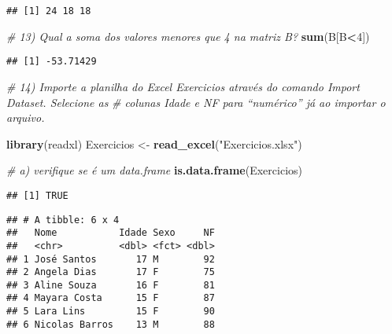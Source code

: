\documentclass[]{article}
\newenvironment{Shaded}{\begin{snugshade}}{\end{snugshade}}
\newcommand{\CommentTok}[1]{\textcolor[rgb]{0.56,0.35,0.01}{\textit{#1}}}
\newcommand{\DecValTok}[1]{\textcolor[rgb]{0.00,0.00,0.81}{#1}}
\newcommand{\KeywordTok}[1]{\textcolor[rgb]{0.13,0.29,0.53}{\textbf{#1}}}
\newcommand{\NormalTok}[1]{#1}
\newcommand{\OperatorTok}[1]{\textcolor[rgb]{0.81,0.36,0.00}{\textbf{#1}}}
\newcommand{\StringTok}[1]{\textcolor[rgb]{0.31,0.60,0.02}{#1}}
\begin{document}
\begin{verbatim}
## [1] 24 18 18
\end{verbatim}

\begin{Shaded}
\begin{Highlighting}[]
\CommentTok{# 13) Qual a soma dos valores menores que 4 na matriz B?}
\KeywordTok{sum}\NormalTok{(B[B}\OperatorTok{<}\DecValTok{4}\NormalTok{])}
\end{Highlighting}
\end{Shaded}

\begin{verbatim}
## [1] -53.71429
\end{verbatim}

\begin{Shaded}
\begin{Highlighting}[]
\CommentTok{# 14) Importe a planilha do Excel Exercicios através do comando Import Dataset. Selecione as}
\CommentTok{# colunas Idade e NF para “numérico” já ao importar o arquivo.}

\KeywordTok{library}\NormalTok{(readxl)}
\NormalTok{Exercicios <-}\StringTok{ }\KeywordTok{read_excel}\NormalTok{(}\StringTok{"Exercicios.xlsx"}\NormalTok{)}

\CommentTok{# a) verifique se é um data.frame}
\KeywordTok{is.data.frame}\NormalTok{(Exercicios)}
\end{Highlighting}
\end{Shaded}

\begin{verbatim}
## [1] TRUE
\end{verbatim}

\begin{Shaded}
\end{Shaded}

\begin{verbatim}
## # A tibble: 6 x 4
##   Nome           Idade Sexo     NF
##   <chr>          <dbl> <fct> <dbl>
## 1 José Santos       17 M        92
## 2 Angela Dias       17 F        75
## 3 Aline Souza       16 F        81
## 4 Mayara Costa      15 F        87
## 5 Lara Lins         15 F        90
## 6 Nicolas Barros    13 M        88
\end{verbatim}
\end{document}
